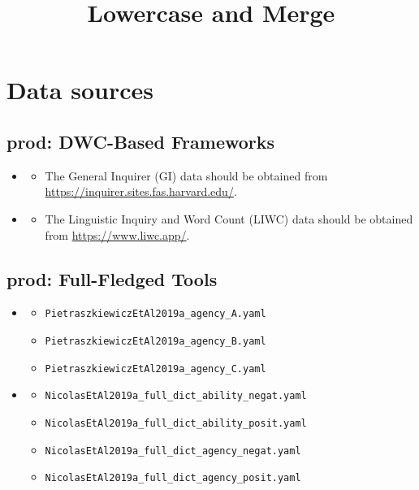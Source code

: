 \documentclass[a4paper,10pt,onecolumn,oneside,openright]{article}
\date{}
\title{Lowercase and Merge}
\begin{document}
\maketitle

\section{Data sources}
\label{sec:org1e87c1d}
\subsection{prod: DWC-Based Frameworks}
\label{sec:orgaacd131}
\begin{itemize}
\item \textcite{PennebakerEtAl2015a}
\begin{itemize}
\item The General Inquirer (GI) data should be obtained from
\url{https://inquirer.sites.fas.harvard.edu/}.
\end{itemize}
\item \textcite{StoneEtAl1966a}
\begin{itemize}
\item The Linguistic Inquiry and Word Count (LIWC) data should be obtained from
\url{https://www.liwc.app/}.
\end{itemize}
\end{itemize}
\subsection{prod: Full-Fledged Tools}
\label{sec:orgb27c5b0}
\begin{itemize}
\item \textcite{PietraszkiewiczEtAl2019a}
\begin{itemize}
\item \texttt{PietraszkiewiczEtAl2019a\_agency\_A.yaml}
\item \texttt{PietraszkiewiczEtAl2019a\_agency\_B.yaml}
\item \texttt{PietraszkiewiczEtAl2019a\_agency\_C.yaml}
\end{itemize}
\item \textcite{NicolasEtAl2021a}
\begin{itemize}
\item \texttt{NicolasEtAl2019a\_full\_dict\_ability\_negat.yaml}
\item \texttt{NicolasEtAl2019a\_full\_dict\_ability\_posit.yaml}
\item \texttt{NicolasEtAl2019a\_full\_dict\_agency\_negat.yaml}
\item \texttt{NicolasEtAl2019a\_full\_dict\_agency\_posit.yaml}
\end{itemize}
\end{itemize}
\end{document}
